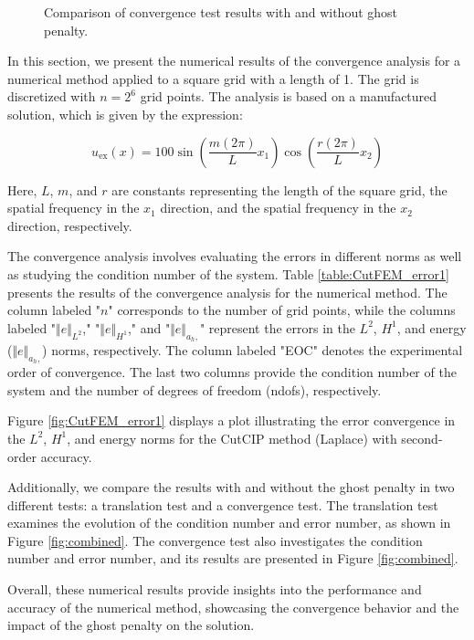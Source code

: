 \begin{figure}
    \centering
    \hfill
    \caption{Comparison of convergence test results with and without ghost penalty.}
    \label{fig:combined_conv}
\end{figure}

In this section, we present the numerical results of the convergence analysis for a numerical method applied to a square grid with a length of 1. The grid is discretized with $n=2^6$ grid points. The analysis is based on a manufactured solution, which is given by the expression:

\[
u_{\text{ex}}(x) = 100 \sin\left(\frac{m(2\pi)}{L}x_1\right)\cos\left(\frac{r(2\pi)}{L}x_2\right)
\]

Here, $L$, $m$, and $r$ are constants representing the length of the square grid, the spatial frequency in the $x_1$ direction, and the spatial frequency in the $x_2$ direction, respectively.

The convergence analysis involves evaluating the errors in different norms as well as studying the condition number of the system. Table \ref{table:CutFEM_error1} presents the results of the convergence analysis for the numerical method. The column labeled "$n$" corresponds to the number of grid points, while the columns labeled "$\Vert e \Vert_{L^2}$," "$\Vert e \Vert_{H^1}$," and "$\Vert e \Vert_{a_h,}$" represent the errors in the $L^2$, $H^1$, and energy ($\Vert e \Vert_{a_h,}$) norms, respectively. The column labeled "EOC" denotes the experimental order of convergence. The last two columns provide the condition number of the system and the number of degrees of freedom (ndofs), respectively.

Figure \ref{fig:CutFEM_error1} displays a plot illustrating the error convergence in the $L^2$, $H^1$, and energy norms for the CutCIP method (Laplace) with second-order accuracy.

Additionally, we compare the results with and without the ghost penalty in two different tests: a translation test and a convergence test. The translation test examines the evolution of the condition number and error number, as shown in Figure \ref{fig:combined}. The convergence test also investigates the condition number and error number, and its results are presented in Figure \ref{fig:combined}.

Overall, these numerical results provide insights into the performance and accuracy of the numerical method, showcasing the convergence behavior and the impact of the ghost penalty on the solution.





